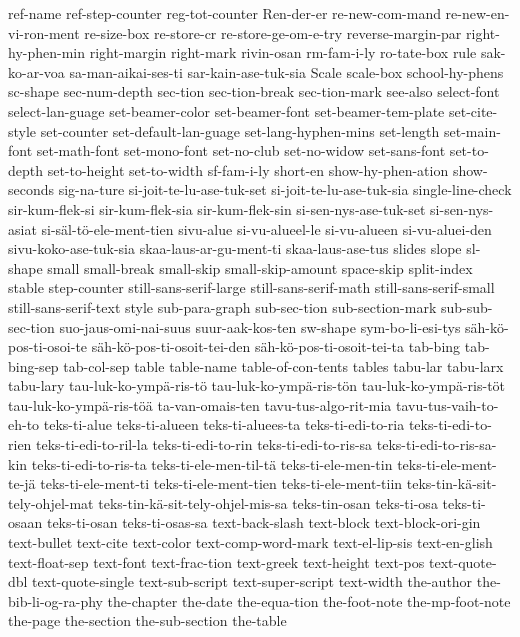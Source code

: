 {ref-name
ref-step-counter
reg-tot-counter
Ren-der-er
re-new-com-mand
re-new-en-vi-ron-ment
re-size-box
re-store-cr
re-store-ge-om-e-try
reverse-margin-par
right-hy-phen-min
right-margin
right-mark
rivin-osan
rm-fam-i-ly
ro-tate-box
rule
sak-ko-ar-voa
sa-man-aikai-ses-ti
sar-kain-ase-tuk-sia
Scale
scale-box
school-hy-phens
sc-shape
sec-num-depth
sec-tion
sec-tion-break
sec-tion-mark
see-also
select-font
select-lan-guage
set-beamer-color
set-beamer-font
set-beamer-tem-plate
set-cite-style
set-counter
set-default-lan-guage
set-lang-hyphen-mins
set-length
set-main-font
set-math-font
set-mono-font
set-no-club
set-no-widow
set-sans-font
set-to-depth
set-to-height
set-to-width
sf-fam-i-ly
short-en
show-hy-phen-ation
show-seconds
sig-na-ture
si-joit-te-lu-ase-tuk-set
si-joit-te-lu-ase-tuk-sia
single-line-check
sir-kum-flek-si
sir-kum-flek-sia
sir-kum-flek-sin
si-sen-nys-ase-tuk-set
si-sen-nys-asiat
si-säl-tö-ele-ment-tien
sivu-alue
si-vu-alueel-le
si-vu-alueen
si-vu-aluei-den
sivu-koko-ase-tuk-sia
skaa-laus-ar-gu-ment-ti
skaa-laus-ase-tus
slides
slope
sl-shape
small
small-break
small-skip
small-skip-amount
space-skip
split-index
stable
step-counter
still-sans-serif-large
still-sans-serif-math
still-sans-serif-small
still-sans-serif-text
style
sub-para-graph
sub-sec-tion
sub-section-mark
sub-sub-sec-tion
suo-jaus-omi-nai-suus
suur-aak-kos-ten
sw-shape
sym-bo-li-esi-tys
säh-kö-pos-ti-osoi-te
säh-kö-pos-ti-osoit-tei-den
säh-kö-pos-ti-osoit-tei-ta
tab-bing
tab-bing-sep
tab-col-sep
table
table-name
table-of-con-tents
tables
tabu-lar
tabu-larx
tabu-lary
tau-luk-ko-ympä-ris-tö
tau-luk-ko-ympä-ris-tön
tau-luk-ko-ympä-ris-töt
tau-luk-ko-ympä-ris-töä
ta-van-omais-ten
tavu-tus-algo-rit-mia
tavu-tus-vaih-to-eh-to
teks-ti-alue
teks-ti-alueen
teks-ti-aluees-ta
teks-ti-edi-to-ria
teks-ti-edi-to-rien
teks-ti-edi-to-ril-la
teks-ti-edi-to-rin
teks-ti-edi-to-ris-sa
teks-ti-edi-to-ris-sa-kin
teks-ti-edi-to-ris-ta
teks-ti-ele-men-til-tä
teks-ti-ele-men-tin
teks-ti-ele-ment-te-jä
teks-ti-ele-ment-ti
teks-ti-ele-ment-tien
teks-ti-ele-ment-tiin
teks-tin-kä-sit-tely-ohjel-mat
teks-tin-kä-sit-tely-ohjel-mis-sa
teks-tin-osan
teks-ti-osa
teks-ti-osaan
teks-ti-osan
teks-ti-osas-sa
text-back-slash
text-block
text-block-ori-gin
text-bullet
text-cite
text-color
text-comp-word-mark
text-el-lip-sis
text-en-glish
text-float-sep
text-font
text-frac-tion
text-greek
text-height
text-pos
text-quote-dbl
text-quote-single
text-sub-script
text-super-script
text-width
the-author
the-bib-li-og-ra-phy
the-chapter
the-date
the-equa-tion
the-foot-note
the-mp-foot-note
the-page
the-section
the-sub-section
the-table
}
